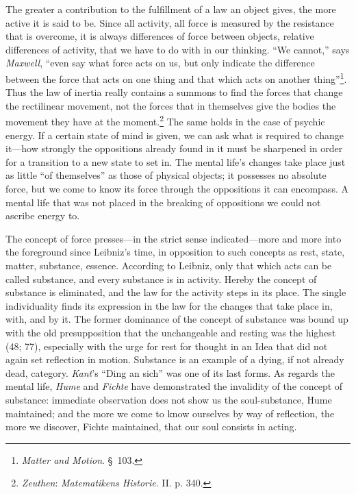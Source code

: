 \documentclass[12pt,a4paper]{book}
\newcommand{\opage}[1]{\marginnote{\footnotesize\textit{[#1]}}}
\begin{document}
\opage{217}The greater a contribution to the fulfillment of a law an object gives, the
more active it is said to be. Since all activity, all force is measured by the
resistance that is overcome, it is always differences of force between
objects, relative differences of activity, that we have to do with in our
thinking. ``We cannot,'' says \emph{Maxwell}, ``even say what force acts on
us, but only indicate the difference between the force that acts on one thing
and that which acts on another thing''\footnote{\emph{Matter and Motion}.
\S\ 103.}. Thus the law of inertia really contains a summons to find the
forces that change the rectilinear movement, not the forces that in themselves
give the bodies the movement they have at the moment.\footnote{\emph{Zeuthen}:
\emph{Matematikens Historie}. II. p. 340.} The same holds in the case of
psychic energy. If a certain state of mind is given, we can ask what is
required to change it---how strongly the oppositions already found in it must
be sharpened in order for a transition to a new state to set in. The mental
life's changes take place just as little ``of themselves'' as those of
physical objects; it possesses no absolute force, but we come to know its
force through the oppositions it can encompass. A mental life that was not
placed in the breaking of oppositions we could not ascribe energy to.

The concept of force presses---in the strict sense indicated---more and more
into the foreground since Leibniz's time, in opposition to such concepts as
rest, state, matter, substance, essence. According to Leibniz, only that which
acts can be called substance, and every substance is in activity. Hereby the
concept of substance is eliminated, and the law for the activity steps in its
place. The single individuality finds its expression in the law for the
changes that take place in, with, and by it. The former dominance of the
concept of substance was bound up with the old presupposition that the
unchangeable and resting was the highest (48; 77), especially with the urge
for rest for thought in an Idea that did not again set reflection in motion.
Substance is an example of a dying, if not already dead, category. \emph{Kant}'s
``Ding an sich'' was \opage{218}one of its last forms. As regards the mental life,
\emph{Hume} and \emph{Fichte} have demonstrated the invalidity of the concept
of substance: immediate observation does not show us the soul-substance, Hume
maintained; and the more we come to know ourselves by way of reflection, the
more we discover, Fichte maintained, that our soul consists in acting.
\end{document}
